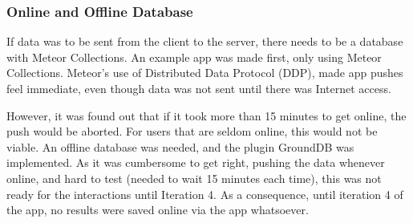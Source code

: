 
\subsubsection{Online and Offline Database}
If data was to be sent from the client to the server, there needs to be a database with Meteor Collections. An example app was made first, only using Meteor Collections. Meteor's use of Distributed Data Protocol (DDP), made app pushes feel immediate, even though data was not sent until there was Internet access.

However, it was found out that if it took more than 15 minutes to get online, the push would be aborted. For users that are seldom online, this would not be viable. An offline database was needed, and the plugin GroundDB was implemented. As it was cumbersome to get right, pushing the data whenever online, and hard to test (needed to wait 15 minutes each time), this was not ready for the interactions until Iteration 4. As a consequence, until iteration 4 of the app, no results were saved online via the app whatsoever.

